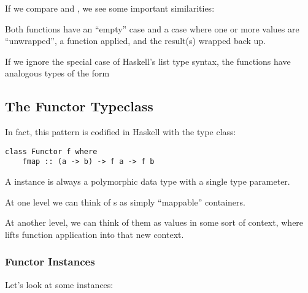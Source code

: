 If we compare  and , we see some important similarities:

\begin{notelist}
    \item Both functions have an ``empty'' case and a case where one or more values are ``unwrapped'',
          a function applied, and the result(s) wrapped back up. 
    \item If we ignore the special case of Haskell's list type syntax, the functions have analogous types
          of the form 
\end{notelist}

\subsection{The Functor Typeclass}

In fact, this pattern is codified in Haskell with the  type class:

\begin{lstlisting}
class Functor f where
    fmap :: (a -> b) -> f a -> f b
\end{lstlisting}

\begin{notelist}
    \item A  instance is always a polymorphic data type with a single type parameter.
    \item At one level we can think of s as simply ``mappable'' containers.
    \item At another level, we can think of them as values in some sort of context, where 
          lifts function application into that new context.
\end{notelist}

\subsubsection{Functor Instances}

Let's look at some  instances:

